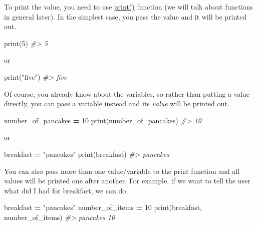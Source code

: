 \documentclass[
]{book}
\newenvironment{Shaded}{\begin{snugshade}}{\end{snugshade}}
\newcommand{\BuiltInTok}[1]{#1}
\newcommand{\CommentTok}[1]{\textcolor[rgb]{0.56,0.35,0.01}{\textit{#1}}}
\newcommand{\DecValTok}[1]{\textcolor[rgb]{0.00,0.00,0.81}{#1}}
\newcommand{\NormalTok}[1]{#1}
\newcommand{\OperatorTok}[1]{\textcolor[rgb]{0.81,0.36,0.00}{\textbf{#1}}}
\newcommand{\StringTok}[1]{\textcolor[rgb]{0.31,0.60,0.02}{#1}}
\begin{document}
To print the value, you need to use \href{https://docs.python.org/3/library/functions.html\#print}{print()} function (we will talk about functions in general later). In the simplest case, you pass the value and it will be printed out.

\begin{Shaded}
\begin{Highlighting}[]
\BuiltInTok{print}\NormalTok{(}\DecValTok{5}\NormalTok{)}
\CommentTok{\#\textgreater{} 5}
\end{Highlighting}
\end{Shaded}

or

\begin{Shaded}
\begin{Highlighting}[]
\BuiltInTok{print}\NormalTok{(}\StringTok{"five"}\NormalTok{)}
\CommentTok{\#\textgreater{} five}
\end{Highlighting}
\end{Shaded}

Of course, you already know about the variables, so rather than putting a value directly, you can pass a variable instead and its \emph{value} will be printed out.

\begin{Shaded}
\begin{Highlighting}[]
\NormalTok{number\_of\_pancakes }\OperatorTok{=} \DecValTok{10}
\BuiltInTok{print}\NormalTok{(number\_of\_pancakes)}
\CommentTok{\#\textgreater{} 10}
\end{Highlighting}
\end{Shaded}

or

\begin{Shaded}
\begin{Highlighting}[]
\NormalTok{breakfast }\OperatorTok{=} \StringTok{"pancakes"}
\BuiltInTok{print}\NormalTok{(breakfast)}
\CommentTok{\#\textgreater{} pancakes}
\end{Highlighting}
\end{Shaded}

You can also pass more than one value/variable to the print function and all values will be printed one after another. For example, if we want to tell the user what did I had for breakfast, we can do

\begin{Shaded}
\begin{Highlighting}[]
\NormalTok{breakfast }\OperatorTok{=} \StringTok{"pancakes"}
\NormalTok{number\_of\_items }\OperatorTok{=} \DecValTok{10}
\BuiltInTok{print}\NormalTok{(breakfast, number\_of\_items)}
\CommentTok{\#\textgreater{} pancakes 10}
\end{Highlighting}
\end{Shaded}
\end{document}
